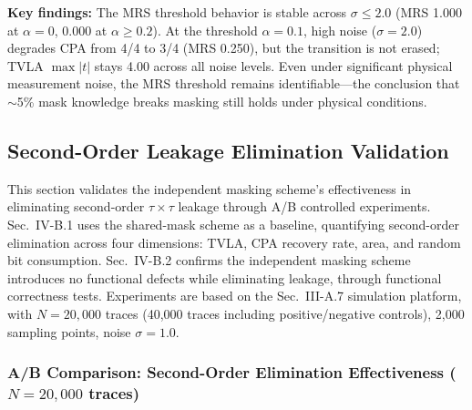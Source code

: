 \documentclass[journal]{IEEEtran}
\begin{document}
\textbf{Key findings:} The MRS threshold behavior is stable across $\sigma \le 2.0$ (MRS 1.000 at $\alpha=0$, 0.000 at $\alpha \ge 0.2$). At the threshold $\alpha=0.1$, high noise ($\sigma=2.0$) degrades CPA from 4/4 to 3/4 (MRS 0.250), but the transition is not erased; TVLA $\max|t|$ stays 4.00 across all noise levels. Even under significant physical measurement noise, the MRS threshold remains identifiable---the conclusion that $\sim$5\% mask knowledge breaks masking still holds under physical conditions.

\subsection{Second-Order Leakage Elimination Validation}

This section validates the independent masking scheme's effectiveness in eliminating second-order $\tau\times\tau$ leakage through A/B controlled experiments. Sec.~IV-B.1 uses the shared-mask scheme as a baseline, quantifying second-order elimination across four dimensions: TVLA, CPA recovery rate, area, and random bit consumption. Sec.~IV-B.2 confirms the independent masking scheme introduces no functional defects while eliminating leakage, through functional correctness tests. Experiments are based on the Sec.~III-A.7 simulation platform, with $N=20{,}000$ traces (40,000 traces including positive/negative controls), 2,000 sampling points, noise $\sigma=1.0$.

\subsubsection{A/B Comparison: Second-Order Elimination Effectiveness ($N=20{,}000$ traces)}
\end{document}
